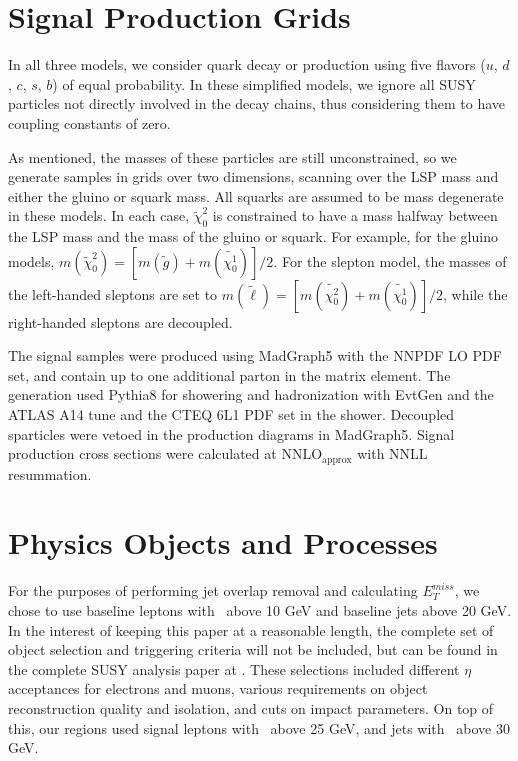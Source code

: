 \section{Signal Production Grids}

In all three models, we consider quark decay or production using five flavors ($u$, $d$, $c$, $s$, $b$) of equal probability. In these simplified models, we ignore all SUSY particles not directly involved in the decay chains, thus considering them to have coupling constants of zero.

As mentioned, the masses of these particles are still unconstrained, so we generate samples in grids over two dimensions, scanning over the LSP mass and either the gluino or squark mass. All squarks are assumed to be mass degenerate in these models. In each case, $\tilde{\chi}_0^2$ is constrained to have a mass halfway between the LSP mass and the mass of the gluino or squark. For example, for the gluino models, $m(\tilde{\chi}_0^2) = [m(\tilde{g})+m(\tilde{\chi^1_0})]/2$. For the slepton model, the masses of the left-handed sleptons are set to $m(\tilde{\ell}) = [m(\tilde{\chi^2_0})+m(\tilde{\chi^1_0})]/2$, while the right-handed sleptons are decoupled.

The signal samples were produced using MadGraph5 with the NNPDF LO PDF set, and contain up to one additional parton in the matrix element. The generation used Pythia8 for showering and hadronization with EvtGen and the ATLAS A14 tune and the CTEQ 6L1 PDF set in the shower. Decoupled sparticles were vetoed in the production diagrams in MadGraph5. Signal production cross sections were calculated at NNLO$_\text{approx}$ with NNLL resummation.

\section{Physics Objects and Processes}

For the purposes of performing jet overlap removal and calculating $E_T^{miss}$, we chose to use baseline leptons with \pt\ above 10 GeV and baseline jets above 20 GeV. In the interest of keeping this paper at a reasonable length, the complete set of object selection and triggering criteria will not be included, but can be found in the complete SUSY analysis paper at \cite{SUSY_2l2j}. These selections included different $\eta$ acceptances for electrons and muons, various requirements on object reconstruction quality and isolation, and cuts on impact parameters. On top of this, our regions used signal leptons with \pt\ above 25 GeV, and jets with \pt\ above 30 GeV.

